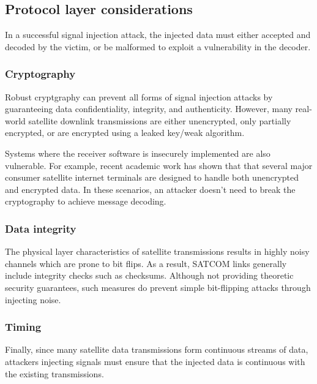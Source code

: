 \subsection{Protocol layer considerations}


In a successful signal injection attack, the injected data must either accepted and decoded by the victim, or be malformed to exploit a vulnerability in the decoder.

\subsubsection{Cryptography}

Robust cryptgraphy can prevent all forms of signal injection attacks by guaranteeing data confidentiality, integrity, and authenticity.
However, many real-world satellite downlink transmissions are either unencrypted, only partially encrypted, or are encrypted using a leaked key/weak algorithm.

Systems where the receiver software is insecurely implemented are also vulnerable.
For example, recent academic work has shown that that several major consumer satellite internet terminals are designed to handle both unencrypted and encrypted data.
In these scenarios, an attacker doesn't need to break the cryptography to achieve message decoding.

\subsubsection{Data integrity}

The physical layer characteristics of satellite transmissions results in highly noisy channels which are prone to bit flips.
As a result, SATCOM links generally include integrity checks such as checksums.
Although not providing theoretic security guarantees, such measures do prevent simple bit-flipping attacks through injecting noise.

\subsubsection{Timing}

Finally, since many satellite data transmissions form continuous streams of data, attackers injecting signals must ensure that the injected data is continuous with the existing transmissions.

